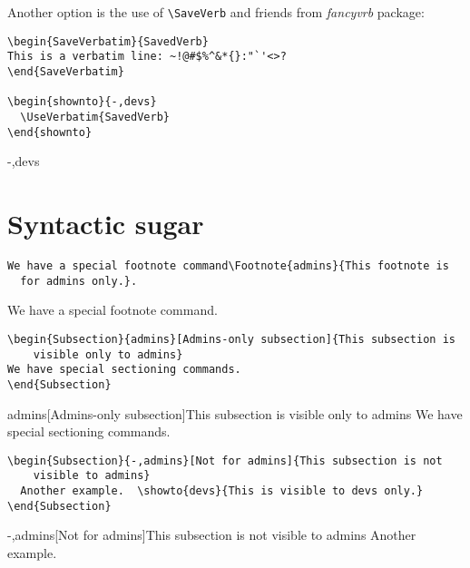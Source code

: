 \documentclass{article}
\begin{document}
Another option is the use of \verb|\SaveVerb| and friends from
\textsl{fancyvrb} package:

\begin{verbatim}
\begin{SaveVerbatim}{SavedVerb}
This is a verbatim line: ~!@#$%^&*{}:"`'<>?  
\end{SaveVerbatim}

\begin{shownto}{-,devs}
  \UseVerbatim{SavedVerb}
\end{shownto}
\end{verbatim}


\begin{shownto}{-,devs}
\end{shownto}

\section{Syntactic sugar}
\label{sec:sugar}

\begin{verbatim}
We have a special footnote command\Footnote{admins}{This footnote is
  for admins only.}.
\end{verbatim}

We have a special footnote command.

\begin{verbatim}
\begin{Subsection}{admins}[Admins-only subsection]{This subsection is
    visible only to admins}
We have special sectioning commands.  
\end{Subsection}
\end{verbatim}

\begin{Subsection}{admins}[Admins-only subsection]{This subsection is
    visible only to admins}
We have special sectioning commands.  
\end{Subsection}

\begin{verbatim}
\begin{Subsection}{-,admins}[Not for admins]{This subsection is not
    visible to admins}
  Another example.  \showto{devs}{This is visible to devs only.}
\end{Subsection}
\end{verbatim}

\begin{Subsection}{-,admins}[Not for admins]{This subsection is not
    visible to admins}
  Another example.  
\end{Subsection}
\end{document}
